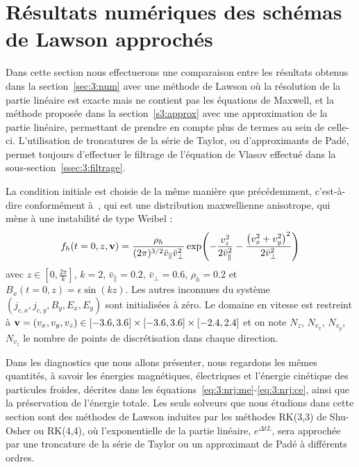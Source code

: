 
\section{Résultats numériques des schémas de Lawson approchés}
\label{s:3:num_m}

Dans cette section nous effectuerons une comparaison entre les résultats obtenus dans la section~\ref{sec:3:num} avec une méthode de Lawson où la résolution de la partie linéaire est exacte mais ne contient pas les équations de Maxwell, et la méthode proposée dans la section~\ref{s3:approx} avec une approximation de la partie linéaire, permettant de prendre en compte plus de termes au sein de celle-ci. L'utilisation de troncatures de la série de Taylor, ou d'approximants de Padé, permet toujours d'effectuer le filtrage de l'équation de Vlasov effectué dans la sous-section~\ref{ssec:3:filtrage}.

La condition initiale est choisie de la même manière que précédemment, c'est-à-dire conformément à~\cite{Holderied:2020}, qui est une distribution maxwellienne anisotrope, qui mène à une instabilité de type Weibel :
$$
  f_h(t=0,z,\vb{v}) = \frac{\rho_h}{(2\pi)^{3/2}\bar{v}_{\|}\bar{v}_\perp^2}\exp( - \frac{v_z^2}{2\bar{v}_{\|}^2} - \frac{\left( v_x^2 + v_y^2 \right)^2}{2\bar{v}_\perp^2} )
$$
avec $z\in[0,\frac{2\pi}{k}]$, $k=2$, $\bar{v}_{\|}=0.2$, $\bar{v}_\perp=0.6$, $\rho_h=0.2$ et $B_x(t=0,z)=\epsilon\sin(kz)$. Les autres inconnues du système $(j_{c,x},j_{c,y},B_y,E_x,E_y)$ sont initialisées à zéro. Le domaine en vitesse est restreint à $\vb{v}=(v_x,v_y,v_z)\in[-3.6,3.6]\times[-3.6,3.6]\times[-2.4,2.4]$ et on note $N_z$, $N_{v_x}$, $N_{v_y}$, $N_{v_z}$ le nombre de points de discrétisation dans chaque direction.

Dans les diagnostics que nous allons présenter, nous regardons les mêmes quantités, à savoir les énergies magnétiques, électriques et l'énergie cinétique des particules froides, décrites dans les équations~\eqref{eq:3:nrj:me}-\eqref{eq:3:nrj:ce}, ainsi que la préservation de l'énergie totale. Les seuls solveurs que nous étudions dans cette section sont des méthodes de Lawson induites par les méthodes RK(3,3) de Shu-Osher ou RK(4,4), où l'exponentielle de la partie linéaire, $e^{\Delta tL}$, sera approchée par une troncature de la série de Taylor ou un approximant de Padé à différents ordres.


